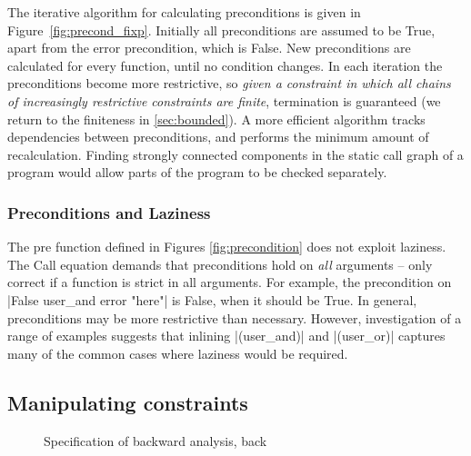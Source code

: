 \documentclass[preprint]{sigplanconf}
\newcommand{\C}[1]{\textsf{#1}}
\begin{document}
The iterative algorithm for calculating preconditions is given in Figure~\ref{fig:precond_fixp}.
Initially all preconditions are assumed to be True, apart from the \C{error} precondition, which is False. New preconditions are calculated for every function, until no condition changes. In each iteration the preconditions become more restrictive, so \textit{given a constraint in which all chains of increasingly restrictive constraints are finite}, termination is guaranteed (we return to the finiteness in \ref{sec:bounded}). A more efficient algorithm tracks dependencies between preconditions, and performs the minimum amount of recalculation. Finding strongly connected components in the static call graph of a program would allow parts of the program to be checked separately.

\subsubsection{Preconditions and Laziness}

The \C{pre} function defined in Figures \ref{fig:precondition} does not exploit laziness. The \C{Call} equation demands that preconditions hold on \textit{all} arguments -- only correct if a function is strict in all arguments. For example, the precondition on |False user_and error "here"| is False, when it should be True. In general, preconditions may be more restrictive than necessary. However, investigation of a range of examples suggests that inlining |(user_and)| and |(user_or)| captures many of the common cases where laziness would be required.


\subsection{Manipulating constraints}
\label{sec:backward}

\begin{figure}
\caption{Specification of backward analysis, \C{back}}
\label{fig:backward}
\end{figure}
\end{document}
